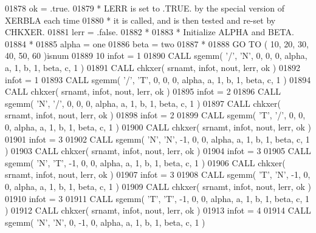 \begin{DoxyCode}
01878       ok = .true.
01879 \textcolor{comment}{*     LERR is set to .TRUE. by the special version of XERBLA each time}
01880 \textcolor{comment}{*     it is called, and is then tested and re-set by CHKXER.}
01881       lerr = .false.
01882 \textcolor{comment}{*}
01883 \textcolor{comment}{*     Initialize ALPHA and BETA.}
01884 \textcolor{comment}{*}
01885       alpha = one
01886       beta = two
01887 \textcolor{comment}{*}
01888       \textcolor{keywordflow}{GO TO} ( 10, 20, 30, 40, 50, 60 )isnum
01889    10 infot = 1
01890       \textcolor{keyword}{CALL }sgemm( \textcolor{stringliteral}{'/'}, \textcolor{stringliteral}{'N'}, 0, 0, 0, alpha, a, 1, b, 1, beta, c, 1 )
01891       \textcolor{keyword}{CALL }chkxer( srnamt, infot, nout, lerr, ok )
01892       infot = 1
01893       \textcolor{keyword}{CALL }sgemm( \textcolor{stringliteral}{'/'}, \textcolor{stringliteral}{'T'}, 0, 0, 0, alpha, a, 1, b, 1, beta, c, 1 )
01894       \textcolor{keyword}{CALL }chkxer( srnamt, infot, nout, lerr, ok )
01895       infot = 2
01896       \textcolor{keyword}{CALL }sgemm( \textcolor{stringliteral}{'N'}, \textcolor{stringliteral}{'/'}, 0, 0, 0, alpha, a, 1, b, 1, beta, c, 1 )
01897       \textcolor{keyword}{CALL }chkxer( srnamt, infot, nout, lerr, ok )
01898       infot = 2
01899       \textcolor{keyword}{CALL }sgemm( \textcolor{stringliteral}{'T'}, \textcolor{stringliteral}{'/'}, 0, 0, 0, alpha, a, 1, b, 1, beta, c, 1 )
01900       \textcolor{keyword}{CALL }chkxer( srnamt, infot, nout, lerr, ok )
01901       infot = 3
01902       \textcolor{keyword}{CALL }sgemm( \textcolor{stringliteral}{'N'}, \textcolor{stringliteral}{'N'}, -1, 0, 0, alpha, a, 1, b, 1, beta, c, 1 )
01903       \textcolor{keyword}{CALL }chkxer( srnamt, infot, nout, lerr, ok )
01904       infot = 3
01905       \textcolor{keyword}{CALL }sgemm( \textcolor{stringliteral}{'N'}, \textcolor{stringliteral}{'T'}, -1, 0, 0, alpha, a, 1, b, 1, beta, c, 1 )
01906       \textcolor{keyword}{CALL }chkxer( srnamt, infot, nout, lerr, ok )
01907       infot = 3
01908       \textcolor{keyword}{CALL }sgemm( \textcolor{stringliteral}{'T'}, \textcolor{stringliteral}{'N'}, -1, 0, 0, alpha, a, 1, b, 1, beta, c, 1 )
01909       \textcolor{keyword}{CALL }chkxer( srnamt, infot, nout, lerr, ok )
01910       infot = 3
01911       \textcolor{keyword}{CALL }sgemm( \textcolor{stringliteral}{'T'}, \textcolor{stringliteral}{'T'}, -1, 0, 0, alpha, a, 1, b, 1, beta, c, 1 )
01912       \textcolor{keyword}{CALL }chkxer( srnamt, infot, nout, lerr, ok )
01913       infot = 4
01914       \textcolor{keyword}{CALL }sgemm( \textcolor{stringliteral}{'N'}, \textcolor{stringliteral}{'N'}, 0, -1, 0, alpha, a, 1, b, 1, beta, c, 1 )

\end{DoxyCode}
